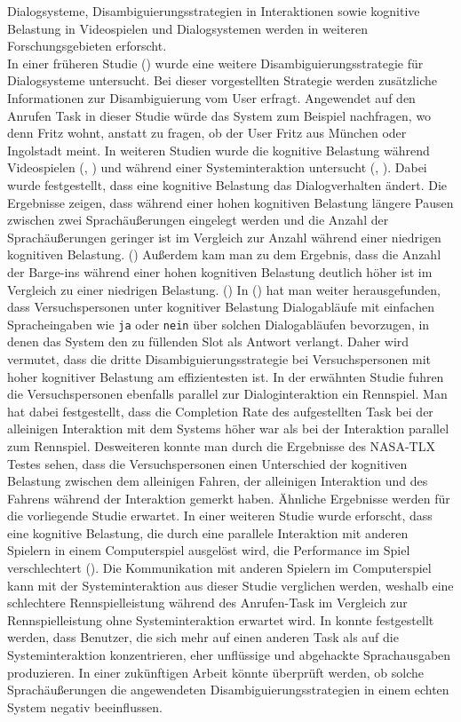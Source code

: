\documentclass[12pt,a4paper]{scrartcl}
\begin{document}
Dialogsysteme, Disambiguierungsstrategien in Interaktionen sowie kognitive Belastung in Videospielen und Dialogsystemen werden in weiteren Forschungsgebieten erforscht. \\
In einer früheren Studie (\cite{idsia}) wurde eine weitere Disambiguierungsstrategie für Dialogsysteme untersucht. Bei dieser vorgestellten Strategie werden zusätzliche Informationen zur Disambiguierung vom User erfragt. Angewendet auf den Anrufen Task in dieser Studie würde das System zum Beispiel nachfragen, wo denn Fritz wohnt, anstatt zu fragen, ob der User Fritz aus München oder Ingolstadt meint.
In weiteren Studien wurde die kognitive Belastung während Videospielen (\cite{CLmmorpg}, \cite{eCLDS}) und während einer Systeminteraktion untersucht (\cite{DbCL}, \cite{eCLDS}). Dabei wurde festgestellt, dass eine kognitive Belastung das Dialogverhalten ändert. Die Ergebnisse zeigen, dass während einer hohen kognitiven Belastung längere Pausen zwischen zwei Sprachäußerungen eingelegt werden und die Anzahl der Sprachäußerungen  geringer ist im Vergleich zur Anzahl während einer niedrigen kognitiven Belastung. (\cite{DbCL}) Außerdem kam man zu dem Ergebnis, dass die Anzahl der Barge-ins während einer hohen kognitiven Belastung deutlich höher ist im Vergleich zu einer niedrigen Belastung. (\cite{eCLDS})
In (\cite{eCLDS}) hat man weiter herausgefunden, dass Versuchspersonen unter kognitiver Belastung Dialogabläufe mit einfachen Spracheingaben wie \texttt{ja} oder \texttt{nein} über solchen Dialogabläufen bevorzugen, in denen das System den zu füllenden Slot als Antwort verlangt. Daher wird vermutet, dass die dritte Disambiguierungsstrategie bei Versuchspersonen mit hoher kognitiver Belastung am effizientesten ist.  In der erwähnten Studie fuhren die Versuchspersonen ebenfalls parallel zur Dialoginteraktion ein Rennspiel. Man hat dabei festgestellt, dass die Completion Rate des aufgestellten Task bei der alleinigen Interaktion mit dem Systems höher war als bei der Interaktion parallel zum Rennspiel. Desweiteren konnte man durch die Ergebnisse des NASA-TLX Testes sehen, dass die Versuchspersonen einen Unterschied der kognitiven Belastung zwischen dem alleinigen Fahren, der alleinigen Interaktion und des Fahrens während der Interaktion gemerkt haben. Ähnliche Ergebnisse werden für die vorliegende Studie erwartet.
In einer weiteren Studie wurde erforscht, dass eine kognitive Belastung, die durch eine parallele Interaktion mit anderen Spielern in einem Computerspiel ausgelöst wird, die Performance im Spiel verschlechtert (\cite{CLmmorpg}). Die Kommunikation mit anderen Spielern im Computerspiel kann mit der Systeminteraktion aus dieser Studie verglichen werden, weshalb eine schlechtere Rennspielleistung während des Anrufen-Task im Vergleich zur Rennspielleistung ohne Systeminteraktion erwartet wird. In \cite{Wozhcd} konnte festgestellt werden, dass Benutzer, die sich mehr auf einen anderen Task als auf die Systeminteraktion konzentrieren, eher unflüssige und abgehackte Sprachausgaben produzieren. In einer zukünftigen Arbeit könnte überprüft werden, ob solche Sprachäußerungen die angewendeten Disambiguierungsstrategien in einem echten System negativ beeinflussen.
\end{document}
